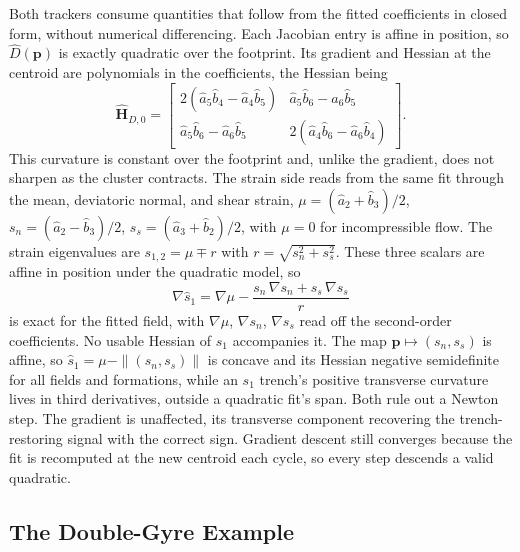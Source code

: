 \documentclass[lettersize,journal]{IEEEtran}
\begin{document}
Both trackers consume quantities that follow from the fitted
coefficients in closed form, without numerical differencing. Each Jacobian entry is affine in position, so $\hat{D}(\mathbf{p})$ is exactly quadratic over the footprint. Its gradient and Hessian at the centroid are polynomials in the coefficients, the Hessian being
\begin{equation}
    \hat{\mathbf{H}}_{D,0} =
    \begin{bmatrix}
        2(\hat{a}_5 \hat{b}_4 - \hat{a}_4 \hat{b}_5) &
        \hat{a}_5 \hat{b}_6 - \hat{a}_6 \hat{b}_5 \\
        \hat{a}_5 \hat{b}_6 - \hat{a}_6 \hat{b}_5 &
        2(\hat{a}_4 \hat{b}_6 - \hat{a}_6 \hat{b}_4)
    \end{bmatrix}.
    \label{eq:hess_det}
\end{equation}
This curvature is constant over the footprint and, unlike the gradient,
does not sharpen as the cluster contracts. The strain side reads from the same fit through the mean, deviatoric
normal, and shear strain, $\mu =
(\hat{a}_2 + \hat{b}_3)/2$, $s_n = (\hat{a}_2 - \hat{b}_3)/2$, $s_s =
(\hat{a}_3 + \hat{b}_2)/2$, with $\mu = 0$ for incompressible flow.
The strain eigenvalues are $s_{1,2} = \mu \mp r$ with $r = \sqrt{s_n^2
+ s_s^2}$. These three scalars are affine in position under the
quadratic model, so
\begin{equation}
    \nabla \hat{s}_1 = \nabla\mu
    - \frac{s_n\,\nabla s_n + s_s\,\nabla s_s}{r}
    \label{eq:grad_s1}
\end{equation}
is exact for the fitted field, with $\nabla\mu$, $\nabla s_n$, $\nabla
s_s$ read off the second-order coefficients. No usable Hessian of $s_1$ accompanies it. The map
$\mathbf{p} \mapsto (s_n, s_s)$ is affine, so $\hat{s}_1 = \mu -
\|(s_n, s_s)\|$ is concave and its Hessian negative semidefinite for
all fields and formations, while an $s_1$ trench's positive transverse curvature lives in third
derivatives, outside a quadratic fit's span. Both rule out a Newton step. The gradient is unaffected, its transverse
component recovering the trench-restoring signal with the correct sign.
Gradient descent still converges because the fit is recomputed at the
new centroid each cycle, so every step descends a valid quadratic.

\subsection{The Double-Gyre Example}
\label{sec:dg_example}
\end{document}
